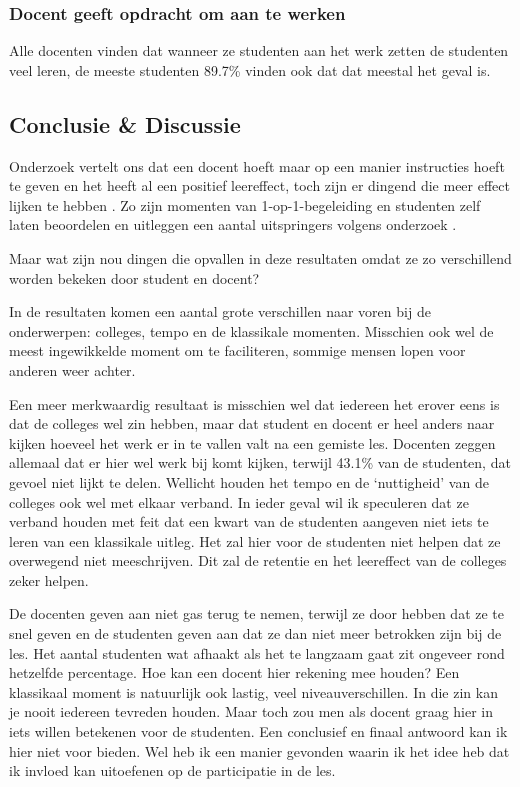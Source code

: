 \subsubsection{Docent geeft opdracht om aan te werken}
Alle docenten vinden dat wanneer ze studenten aan het werk zetten de studenten veel leren, de meeste studenten 89.7\% vinden ook dat dat meestal het geval is.

\subsection{Conclusie \& Discussie}

Onderzoek vertelt ons dat een docent hoeft maar op een manier instructies hoeft te geven en het heeft al een positief leereffect, toch zijn er dingend die meer effect lijken te hebben \cite{hattie2008visible}. Zo zijn momenten van 1-op-1-begeleiding en studenten zelf laten beoordelen en uitleggen een aantal uitspringers volgens onderzoek \cite{schneiderVariables, hattie2008visible}.

Maar wat zijn nou dingen die opvallen in deze resultaten omdat ze zo verschillend worden bekeken door student en docent?

In de resultaten komen een aantal grote verschillen naar voren bij de onderwerpen: colleges, tempo en de klassikale momenten. Misschien ook wel de meest ingewikkelde moment om te faciliteren, sommige mensen lopen voor anderen weer achter.

Een meer merkwaardig resultaat is misschien wel dat iedereen het erover eens is dat de colleges wel zin hebben, maar dat student en docent er heel anders naar kijken hoeveel het werk er in te vallen valt na een gemiste les. Docenten zeggen allemaal dat er hier wel werk bij komt kijken, terwijl 43.1\% van de studenten, dat gevoel niet lijkt te delen. Wellicht houden het tempo en de `nuttigheid' van de colleges ook wel met elkaar verband. In ieder geval wil ik speculeren dat ze verband houden met feit dat een kwart van de studenten aangeven niet iets te leren van een klassikale uitleg. Het zal hier voor de studenten niet helpen dat ze overwegend niet meeschrijven. Dit zal de retentie en het leereffect van de colleges zeker helpen.

De docenten geven aan niet gas terug te nemen, terwijl ze door hebben dat ze te snel geven en de studenten geven aan dat ze dan niet meer betrokken zijn bij de les. Het aantal studenten wat afhaakt als het te langzaam gaat zit ongeveer rond hetzelfde percentage. Hoe kan een docent hier rekening mee houden? Een klassikaal moment is natuurlijk ook lastig, veel niveauverschillen. In die zin kan je nooit iedereen tevreden houden. Maar toch zou men als docent graag hier in iets willen betekenen voor de studenten. Een conclusief en finaal antwoord kan ik hier niet voor bieden. Wel heb ik een manier gevonden waarin ik het idee heb dat ik invloed kan uitoefenen op de participatie in de les.

